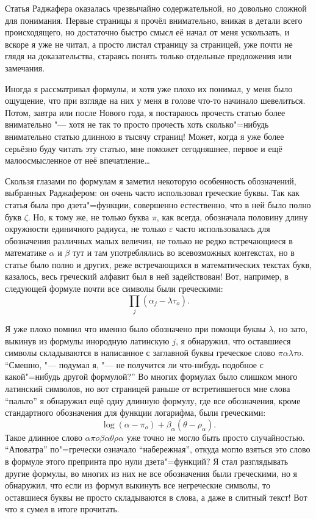 Статья Раджафера оказалась чрезвычайно содержательной, но довольно сложной для
понимания.
Первые страницы я прочёл внимательно, вникая в детали всего происходящего, но
достаточно быстро смысл её начал от меня ускользать, и вскоре я уже не читал, а
просто листал страницу за страницей, уже почти не глядя на доказательства,
стараясь понять только отдельные предложения или замечания.

Иногда я рассматривал формулы, и хотя уже плохо их понимал, у меня было ощущение,
что при взгляде на них у меня в голове что-то начинало шевелиться.
Потом, завтра или после Нового года, я постараюсь прочесть статью более
внимательно "--- хотя не так то просто прочесть хоть сколько"=нибудь внимательно
статью длинною в тысячу страниц!
Может, когда я уже более серьёзно буду читать эту статью, мне поможет
сегодняшнее, первое и ещё малоосмысленное от неё впечатление\ldots

Скользя глазами по формулам я заметил некоторую особенность обозначений,
выбранных Раджафером: он очень часто использовал греческие буквы.
Так как статья была про дзета"=функции, совершенно естественно, что в ней было
полно букв $\zeta$.
Но, к тому же, не только буква $\pi$, как всегда, обозначала половину длину
окружности единичного радиуса, не только $\varepsilon$ часто использовалась для
обозначения различных малых величин, не только не редко встречающиеся в
математике $\alpha$ и $\beta$ тут и там употреблялись во всевозможных контекстах,
но в статье было полно и других, реже встречающихся в математических текстах
букв, казалось, весь греческий алфавит был в ней задействован!
Вот, например, в следующей формуле почти все символы были греческими:
\begin{equation*}
\prod_j\left(\alpha_j - \lambda\tau_o\right).
\end{equation*}

Я уже плохо помнил что именно было обозначено при помощи буквы $\lambda$, но
зато, выкинув из формулы инородную латинскую $j$, я обнаружил, что оставшиеся
символы складываются в написанное с заглавной буквы греческое слово
$\pi\alpha\lambda\tau o$.
\enquote{Смешно, "--- подумал я, "--- не получится ли что-нибудь подобное с
какой"=нибудь другой формулой?}
Во многих формулах было слишком много латинский символов, но вот страницей
раньше от встретившегося мне слова \enquote{пальто} я обнаружил ещё одну длинную
формулу, где все обозначения, кроме стандартного обозначения для функции
логарифма, были греческими:
\begin{equation*}
\log(\alpha - \pi_o) + \beta_\alpha(\theta - \rho_\alpha).
\end{equation*}
Такое длинное слово $\alpha\pi o\beta\alpha\theta\rho\alpha$ уже точно не могло
быть просто случайностью.
\enquote{Аповатра} по"=гречески означало \enquote{набережная}, откуда могло
взяться это слово в формуле этого препринта про нули дзета"=функций?
Я стал разглядывать другие формулы, во многих из них не все обозначения были
греческими, но я обнаружил, что если из формул выкинуть все негреческие символы,
то оставшиеся буквы не просто складываются в слова, а даже в слитный текст!
Вот что я сумел в итоге прочитать.
